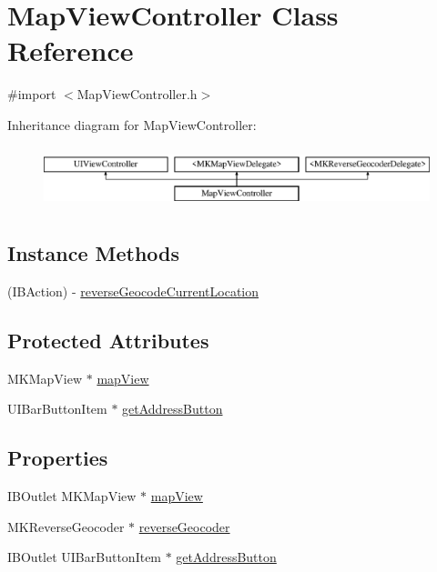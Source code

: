 \hypertarget{interface_map_view_controller}{\section{Map\-View\-Controller Class Reference}
\label{interface_map_view_controller}
}


{\ttfamily \#import $<$Map\-View\-Controller.\-h$>$}

Inheritance diagram for Map\-View\-Controller\-:\begin{figure}[H]
\begin{center}
\leavevmode
\includegraphics[height=1.812298cm]{interface_map_view_controller}
\end{center}
\end{figure}
\subsection*{Instance Methods}
\begin{DoxyCompactItemize}
\item 
(I\-B\-Action) -\/ \hyperlink{interface_map_view_controller_ab3f6d11f99f3a24c5c81b3d5e00a97dd}{reverse\-Geocode\-Current\-Location}
\end{DoxyCompactItemize}
\subsection*{Protected Attributes}
\begin{DoxyCompactItemize}
\item 
M\-K\-Map\-View $\ast$ \hyperlink{interface_map_view_controller_aeca56f93083ef15cb818d6627fc0afda}{map\-View}
\item 
U\-I\-Bar\-Button\-Item $\ast$ \hyperlink{interface_map_view_controller_a05820496aedc25682d9ea8f016872903}{get\-Address\-Button}
\end{DoxyCompactItemize}
\subsection*{Properties}
\begin{DoxyCompactItemize}
\item 
I\-B\-Outlet M\-K\-Map\-View $\ast$ \hyperlink{interface_map_view_controller_a250ca1eb6ca5dbeef2c758cfb6c54352}{map\-View}
\item 
M\-K\-Reverse\-Geocoder $\ast$ \hyperlink{interface_map_view_controller_a773225e6535bdafdcde9dbc38e648d90}{reverse\-Geocoder}
\item 
I\-B\-Outlet U\-I\-Bar\-Button\-Item $\ast$ \hyperlink{interface_map_view_controller_ad82a4da45ee7fedf7ccf752d8f227de0}{get\-Address\-Button}
\end{DoxyCompactItemize}


